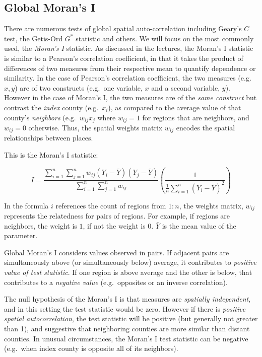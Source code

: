 \documentclass[
]{book}
\begin{document}
\hypertarget{global-morans-i}{%
\subsection{Global Moran's I}\label{global-morans-i}}

There are numerous tests of global spatial auto-correlation including Geary's \(C\) test, the Getis-Ord \(G^*\) statistic and others. We will focus on the most commonly used, the \emph{Moran's I} statistic. As discussed in the lectures, the Moran's I statistic is similar to a Pearson's correlation coefficient, in that it takes the product of differences of two measures from their respective mean to quantify dependence or similarity. In the case of Pearson's correlation coefficient, the two measures (e.g.~\(x,y\)) are of two constructs (e.g.~one variable, \(x\) and a second variable, \(y\)). However in the case of Moran's I, the two measures are of the \emph{same construct} but contrast the \emph{index} county (e.g.~\(x_i\)), as compared to the average value of that county's \emph{neighbors} (e.g.~\(w_{ij}x_j\) where \(w_{ij}=1\) for regions that are neighbors, and \(w_{ij}=0\) otherwise. Thus, the spatial weights matrix \(w_{ij}\) encodes the spatial relationships between places.

This is the Moran's I statistic:

\[I=\frac{\sum\limits_{i=1}^{n} \sum\limits_{j=1}^{n} w_{ij} (Y_i-\bar Y)(Y_j-\bar Y)}{ \sum\limits_{i=1}^{n} \sum\limits_{j=1}^{n} w_{ij}} \left( \frac{1}{\frac{1}{n} \sum\limits_{i=1}^{n} (Y_i-\bar Y)^2} \right)\]

In the formula \(i\) references the count of regions from \(1:n\), the weights matrix, \(w_{ij}\) represents the relatedness for pairs of regions. For example, if regions are neighbors, the weight is \(1\), if not the weight is \(0\). \(\bar Y\) is the mean value of the parameter.

Global Moran's I considers values observed in pairs. If adjacent pairs are simultaneously above (or simultaneously below) average, it contributes to \emph{positive value of test statistic}. If one region is above average and the other is below, that contributes to a \emph{negative value} (e.g.~opposites or an inverse correlation).

The null hypothesis of the Moran's I is that measures are \emph{spatially independent}, and in this setting the test statistic would be zero. However if there is \emph{positive spatial autocorrelation}, the test statistic will be positive (but generally not greater than 1), and suggestive that neighboring counties are more similar than distant counties. In unusual circumstances, the Moran's I test statistic can be negative (e.g.~when index county is opposite all of its neighbors).
\end{document}
